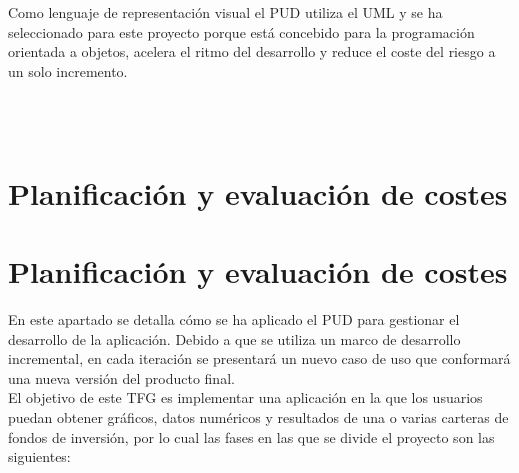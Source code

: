 \documentclass[12pt, a4paper]{article}
\newcommand*\parttitle{}
\let\origpart\part
\renewcommand*{\part}[2][]{%
	\ifx\\#1\\%
	\origpart{#2}%
	\renewcommand*\parttitle{#2}%
	\else
	\origpart[#1]{#2}%
	\renewcommand*\parttitle{#1}%
	\fi
}
\begin{document}
Como lenguaje de representación visual el \gls{PUD} utiliza el \gls{UML} y se ha seleccionado para este proyecto porque está concebido para la programación orientada a objetos, acelera el ritmo del desarrollo y reduce el coste del riesgo a un solo incremento.   

\newpage 

\part{Planificación y evaluación de costes}

En este apartado se detalla cómo se ha aplicado el \gls{PUD} para gestionar el desarrollo de la aplicación. Debido a que se utiliza un marco de desarrollo incremental, en cada iteración se presentará un nuevo caso de uso que conformará una nueva versión del producto final.\\

El objetivo de este \gls{TFG} es implementar una aplicación en la que los usuarios puedan obtener gráficos, datos numéricos y resultados de una o varias carteras de fondos de inversión, por lo cual las fases en las que se divide el proyecto son las siguientes:\\


\end{document}
